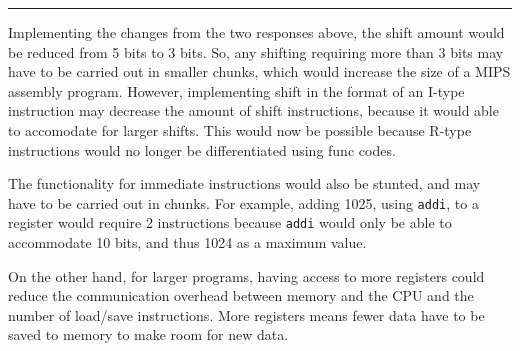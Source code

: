 \documentclass[11pt]{exam}
\newcommand{\cc}[1]{\texttt{#1}}
\newcounter{questionCounter}
\newcounter{partCounter}[questionCounter]
\newenvironment{namedquestion}[1]{%
    \addtocounter{questionCounter}{1}%
    \setcounter{partCounter}{0}%
    \vspace{.2in}%
        \noindent{\bf #1}%
    \vspace{0.3em} \hrule \vspace{.1in}%
}{}
\begin{document}
\begin{namedquestion}{Question 2.18.3}
Implementing the changes from the two responses above, the shift amount would be reduced from 5 bits to 3 bits. So, any shifting requiring more than 3 bits may have to be carried out in smaller chunks, which would increase the size of a MIPS assembly program. However, implementing shift in the format of an I-type instruction may decrease the amount of shift instructions, because it would able to accomodate for larger shifts. This would now be possible because R-type instructions would no longer be differentiated using func codes. 

The functionality for immediate instructions would also be stunted, and may have to be carried out in chunks. For example, adding 1025, using \cc{addi}, to a register would require 2 instructions because \cc{addi} would only be able to accommodate 10 bits, and thus 1024 as a maximum value. 

On the other hand, for larger programs, having access to more registers could reduce the communication overhead between memory and the CPU and the number of load/save instructions. More registers means fewer data have to be saved to memory to make room for new data. 


\end{namedquestion}

\printbibliography
\end{document}

